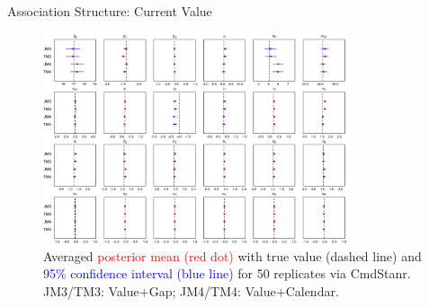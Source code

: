 \documentclass[fleqn]{beamer}
\begin{document}
\begin{frame}{Association Structure: Current Value}
    \begin{figure}[ht] 
        \includegraphics[width=0.8\textwidth]{Figures/Chp3_sim_2.jpg} 
        \caption{\tiny Averaged \textcolor{red}{posterior mean (red dot)} with true value (dashed line) and \textcolor{blue}{95\% confidence interval (blue line)} for 50 replicates via CmdStanr. JM3/TM3: Value+Gap; JM4/TM4: Value+Calendar.}
    \end{figure}
\end{frame}
\end{document}
